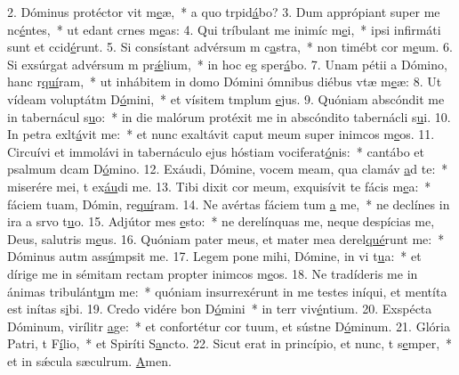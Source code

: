 2. Dóminus protéctor vit m\uline{e}æ,~* a quo trpid\uline{á}bo?
3. Dum apprópiant super me nc\uline{é}ntes,~* ut edant crnes m\uline{e}as:
4. Qui tríbulant me inimíc m\uline{e}i,~* ipsi infirmáti sunt et ccid\uline{é}runt.
5. Si consístant advérsum m c\uline{a}stra,~* non timébt cor m\uline{e}um.
6. Si exsúrgat advérsum m pr\uline{ǽ}lium,~* in hoc eg sper\uline{á}bo.
7. Unam pétii a Dómino, hanc r\uline{quí}ram,~* ut inhábitem in domo Dómini ómnibus diébus vtæ m\uline{e}æ:
8. Ut vídeam voluptátm D\uline{ó}mini,~* et vísitem tmplum \uline{e}jus.
9. Quóniam abscóndit me in tabernácul s\uline{u}o:~* in die malórum protéxit me in abscóndito tabernácli s\uline{u}i.
10. In petra exlt\uline{á}vit me:~* et nunc exaltávit caput meum super inimcos m\uline{e}os.
11. Circuívi et immolávi in tabernáculo ejus hóstiam vociferat\uline{ó}nis:~* cantábo et psalmum dcam D\uline{ó}mino.
12. Exáudi, Dómine, vocem meam, qua clamáv \uline{a}d te:~* miserére mei, t ex\uline{áu}di me.
13. Tibi dixit cor meum, exquisívit te fácis m\uline{e}a:~* fáciem tuam, Dómin, re\uline{quí}ram.
14. Ne avértas fáciem tum \uline{a} me,~* ne declínes in ira a srvo t\uline{u}o.
15. Adjútor mes \uline{e}sto:~* ne derelínquas me, neque despícias me, Deus, salutris m\uline{e}us.
16. Quóniam pater meus, et mater mea derel\uline{qué}runt me:~* Dóminus autm ass\uline{ú}mpsit me.
17. Legem pone mihi, Dómine, in vi t\uline{u}a:~* et dírige me in sémitam rectam propter inimcos m\uline{e}os.
18. Ne tradíderis me in ánimas tribulánt\uline{u}m me:~* quóniam insurrexérunt in me testes iníqui, et mentíta est inítas s\uline{i}bi.
19. Credo vidére bon D\uline{ó}mini~* in terr viv\uline{é}ntium.
20. Exspécta Dóminum, virílitr \uline{a}ge:~* et confortétur cor tuum, et sústne D\uline{ó}minum.
21. Glória Patri, t F\uline{í}lio,~* et Spiríti S\uline{a}ncto.
22. Sicut erat in princípio, et nunc, t s\uline{e}mper,~* et in sǽcula sæculrum. \uline{A}men.
